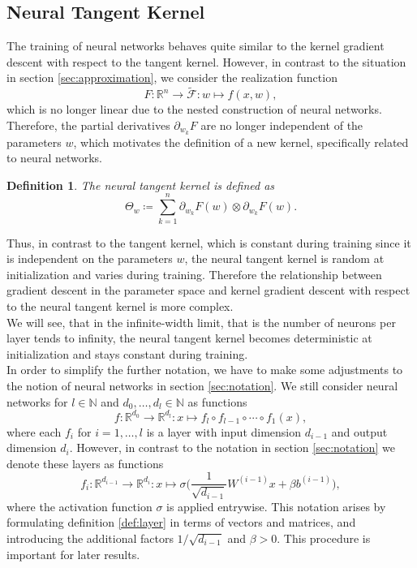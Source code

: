 \documentclass[11pt, a4paper]{article}
\newtheorem{definition}[theorem]{Definition}
\newcommand{\N}{\mathds{N}}
\newcommand{\R}{\mathds{R}}
\newcommand{\F}{\mathcal{F}}
\begin{document}
\subsection{Neural Tangent Kernel}

The training of neural networks behaves quite similar to the kernel gradient descent with respect to the tangent kernel. However, in contrast to the situation in section \ref{sec:approximation}, we consider the realization function
\[ F: \R^n \to \tilde{\F} : w \mapsto f(x,w), \]
 which is no longer linear due to the nested construction of neural networks. Therefore, the partial derivatives $\partial_{w_k}F$ are no longer independent of the parameters $w$, which motivates the definition of a new kernel, specifically related to neural networks.

\begin{definition} \label{def:ntk}
The neural tangent kernel is defined as
\[ \Theta_w \coloneq \sum_{k=1}^{n} \partial_{w_k} F(w) \otimes \partial_{w_k} F(w). \]
\end{definition}

Thus, in contrast to the tangent kernel, which is constant during training since it is independent on the parameters $w$, the neural tangent kernel is random at initialization and varies during training. Therefore the relationship between gradient descent in the parameter space and kernel gradient descent with respect to the neural tangent kernel is more complex. \\

We will see, that in the infinite-width limit, that is the number of neurons per layer tends to infinity, the neural tangent kernel becomes deterministic at initialization and stays constant during training. \\

In order to simplify the further notation, we have to make some adjustments to the notion of neural networks in section \ref{sec:notation}. We still consider neural networks for $l \in \N$ and $d_0, \dots, d_l \in \N$ as functions
\[ f: \R^{d_0} \to \R^{d_l} : x \mapsto f_l \circ f_{l-1} \circ \cdots \circ f_1(x), \]
where each $f_i$ for $i=1, \dots, l$ is a layer with input dimension $d_{i-1}$ and output dimension $d_i$. However, in contrast to the notation in section \ref{sec:notation} we denote these layers as functions 
\[ f_{i} : \R^{d_{i-1}} \to \R^{d_i} : x \mapsto \sigma \Big ( \frac{1}{\sqrt{d_{i-1}}} W^{(i-1)}x + \beta b^{(i-1)} \Big ), \]
where the activation function $\sigma$ is applied entrywise. This notation arises by formulating definition \ref{def:layer} in terms of vectors and matrices, and introducing the additional factors $1/\sqrt{d_{i-1}}$ and $\beta > 0$. This procedure is important for later results.
\end{document}
